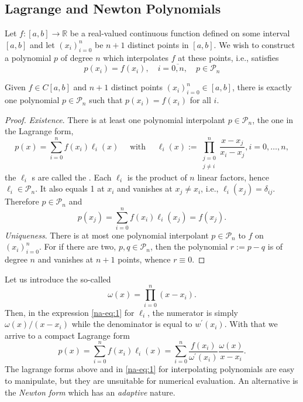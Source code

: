 \documentclass[a4paper]{scrartcl}
\begin{document}
\subsection{Lagrange and Newton Polynomials}

Let $f:[a, b] \rightarrow \mathbb{R}$ be a real-valued continuous function defined on some interval $[a, b]$ and let $\left(x_{i}\right)_{i=0}^{n}$ be $n+1$ distinct points in $[a, b]$. We wish to construct a polynomial $p$ of degree $n$ which interpolates $f$ at these points, i.e., satisfies
$$
p\left(x_{i}\right)=f\left(x_{i}\right), \quad i=\overline{0, n}, \quad p \in \mathcal{P}_{n}
$$

\begin{theorem}
Given $f \in C[a, b]$ and $n+1$ distinct points $\left(x_{i}\right)_{i=0}^{n} \in[a, b]$, there is exactly one polynomial $p \in \mathcal{P}_{n}$ such that $p\left(x_{i}\right)=f\left(x_{i}\right)$ for all $i$.
\end{theorem}
\begin{proof}
  \emph{Existence}. There is at least one polynomial interpolant $p \in \mathcal{P}_{n}$, the one in the Lagrange form,
  \begin{equation}\label{na-eq:1}
p(x)=\sum_{i=0}^{n} f\left(x_{i}\right) \ell_{i}(x) \quad \text { with } \quad \ell_{i}(x):=\prod_{\substack{j=0\\ j \neq i}}^{n} \frac{x-x_{j}}{x_{i}-x_{j}}, i = 0, \dots, n,\tag{$\dagger$}
  \end{equation}
the $\ell_{i}$ s are called the . Each $\ell_{i}$ is the product of $n$ linear factors, hence $\ell_{i} \in \mathcal{P}_{n}$. It also equals 1 at $x_{i}$ and vanishes at $x_{j} \neq x_{i}$, i.e., $\ell_{i}\left(x_{j}\right)=\delta_{i j}$. Therefore $p \in \mathcal{P}_{n}$ and
$$
p\left(x_{j}\right)=\sum_{i=0}^{n} f\left(x_{i}\right) \ell_{i}\left(x_{j}\right)=f\left(x_{j}\right) .
$$
\emph{Uniqueness}. There is at most one polynomial interpolant $p \in \mathcal{P}_{n}$ to $f$ on $\left(x_{i}\right)_{i=0}^{n}$. For if there are two, $p, q \in \mathcal{P}_{n}$, then the polynomial $r:=p-q$ is of degree $n$ and vanishes at $n+1$ points, whence $r \equiv 0$.
\end{proof}

Let us introduce the so-called 
$$
\omega(x)=\prod_{i=0}^{n}\left(x-x_{i}\right) .
$$
Then, in the expression \eqref{na-eq:1} for $\ell_{i}$, the numerator is simply $\omega(x) /\left(x-x_{i}\right)$ while the denominator is equal to $w^{\prime}\left(x_{i}\right)$. With that we arrive to a compact Lagrange form
$$
\boxed{
  p(x)=\sum_{i=0}^{n} f\left(x_{i}\right) \ell_{i}(x)=\sum_{i=0}^{n} \frac{f\left(x_{i}\right)}{\omega^{\prime}\left(x_{i}\right)} \frac{\omega(x)}{x-x_{i}}
}.
$$
The lagrange forms above and in \eqref{na-eq:1} for interpolating polynomials are easy to manipulate, but they are unsuitable for numerical evaluation. An alternative is the \emph{Newton form} which has an \emph{adaptive} nature.
\end{document}
